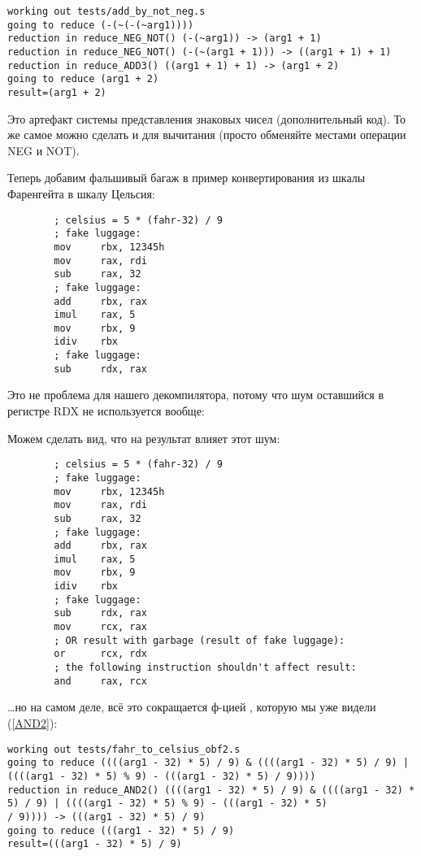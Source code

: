 \begin{lstlisting}
working out tests/add_by_not_neg.s
going to reduce (-(~(-(~arg1))))
reduction in reduce_NEG_NOT() (-(~arg1)) -> (arg1 + 1)
reduction in reduce_NEG_NOT() (-(~(arg1 + 1))) -> ((arg1 + 1) + 1)
reduction in reduce_ADD3() ((arg1 + 1) + 1) -> (arg1 + 2)
going to reduce (arg1 + 2)
result=(arg1 + 2)
\end{lstlisting}

Это артефакт системы представления знаковых чисел (дополнительный код).
То же самое можно сделать и для вычитания (просто обменяйте местами операции NEG и NOT).

Теперь добавим фальшивый багаж в пример конвертирования из шкалы Фаренгейта в шкалу Цельсия:

\begin{lstlisting}
        ; celsius = 5 * (fahr-32) / 9
        ; fake luggage:
        mov     rbx, 12345h
        mov     rax, rdi
        sub     rax, 32
        ; fake luggage:
        add     rbx, rax
        imul    rax, 5
        mov     rbx, 9
        idiv    rbx
        ; fake luggage:
        sub     rdx, rax
\end{lstlisting}

Это не проблема для нашего декомпилятора, потому что шум оставшийся в регистре RDX не используется вообще:



Можем сделать вид, что на результат влияет этот шум:

\begin{lstlisting}
        ; celsius = 5 * (fahr-32) / 9
        ; fake luggage:
        mov     rbx, 12345h
        mov     rax, rdi
        sub     rax, 32
        ; fake luggage:
        add     rbx, rax
        imul    rax, 5
        mov     rbx, 9
        idiv    rbx
        ; fake luggage:
        sub     rdx, rax
        mov     rcx, rax
        ; OR result with garbage (result of fake luggage):
        or      rcx, rdx
        ; the following instruction shouldn't affect result:
        and     rax, rcx
\end{lstlisting}

\dots но на самом деле, всё это сокращается ф-цией , которую мы уже видели (\ref{AND2}):

\begin{lstlisting}
working out tests/fahr_to_celsius_obf2.s
going to reduce ((((arg1 - 32) * 5) / 9) & ((((arg1 - 32) * 5) / 9) | ((((arg1 - 32) * 5) % 9) - (((arg1 - 32) * 5) / 9))))
reduction in reduce_AND2() ((((arg1 - 32) * 5) / 9) & ((((arg1 - 32) * 5) / 9) | ((((arg1 - 32) * 5) % 9) - (((arg1 - 32) * 5)
/ 9)))) -> (((arg1 - 32) * 5) / 9)
going to reduce (((arg1 - 32) * 5) / 9)
result=(((arg1 - 32) * 5) / 9)
\end{lstlisting}

